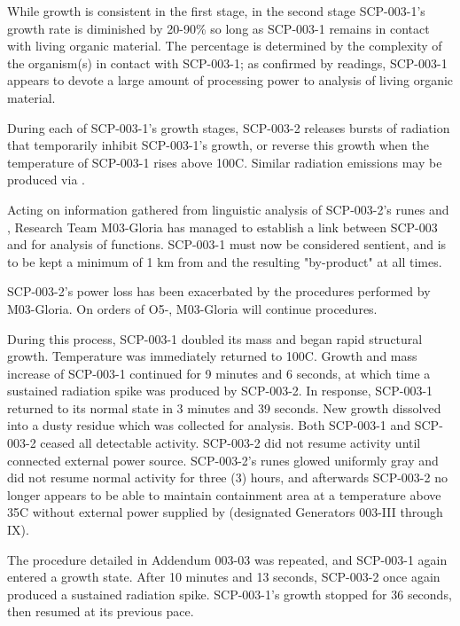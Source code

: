 While growth is consistent in the first stage, in the second stage SCP-003-1's growth rate is diminished by 20-90\% so long as SCP-003-1 remains in contact with living organic material. The percentage is determined by the complexity of the organism(s) in contact with SCP-003-1; as confirmed by \redacted readings, SCP-003-1 appears to devote a large amount of processing power to analysis of living organic material.

During each of SCP-003-1's growth stages, SCP-003-2 releases bursts of radiation that temporarily inhibit SCP-003-1's growth, or reverse this growth when the temperature of SCP-003-1 rises above 100\degree C. Similar radiation emissions may be produced via \expunged.

 Acting on information gathered from linguistic analysis of SCP-003-2's runes and \expunged, Research Team M03-Gloria has managed to establish a link between SCP-003 and \expunged for analysis of functions. SCP-003-1 must now be considered sentient, and is to be kept a minimum of 1 km from \expunged and the resulting "by-product" at all times.

 SCP-003-2's power loss has been exacerbated by the procedures performed by M03-Gloria. On orders of O5-, M03-Gloria will continue procedures.

 \expunged During this process, SCP-003-1 doubled its mass and began rapid structural growth. Temperature was immediately returned to 100\degree C. Growth and mass increase of SCP-003-1 continued for 9 minutes and 6 seconds, at which time a sustained radiation spike was produced by SCP-003-2. In response, SCP-003-1 returned to its normal state in 3 minutes and 39 seconds. New growth dissolved into a dusty residue which was collected for analysis. Both SCP-003-1 and SCP-003-2 ceased all detectable activity. SCP-003-2 did not resume activity until connected \redacted external power source. SCP-003-2's runes glowed uniformly gray and did not resume normal activity for three (3) hours, and afterwards \expunged SCP-003-2 no longer appears to be able to maintain containment area at a temperature above 35\degree C without external power supplied by \redacted (designated Generators 003-III through IX).

 The procedure detailed in Addendum 003-03 was repeated, and SCP-003-1 again entered a growth state. After 10 minutes and 13 seconds, SCP-003-2 once again produced a sustained radiation spike. SCP-003-1's growth stopped for 36 seconds, then resumed at its previous pace.

